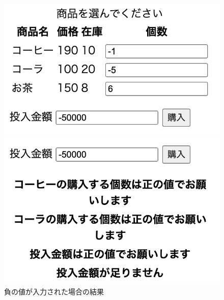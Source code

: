 \documentclass[12pt]{jarticle}
\begin{document}
\begin{figure}[h]
    \begin{minipage}{0.5\hsize}
        \begin{center}
            \includegraphics[scale=0.4]{kadai2_2_6.png}
        \end{center}
    \end{minipage}
    \begin{minipage}{0.5\hsize}
        \begin{center}
            \includegraphics[scale=0.4]{kadai2_2_7.png}
        \end{center}
    \end{minipage}
    \caption{負の値が入力された場合の結果}
\end{figure}
\end{document}
